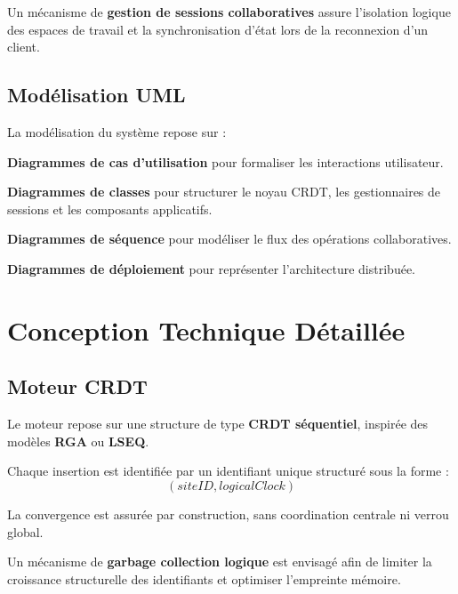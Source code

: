 \documentclass[a4paper,oneside,12pt]{book}
\begin{document}
Un mécanisme de \textbf{gestion de sessions collaboratives} assure l’isolation logique des espaces de travail et la synchronisation d’état lors de la reconnexion d’un client.

\section{\textbf{Modélisation UML}}

La modélisation du système repose sur :

\textbf{Diagrammes de cas d’utilisation} pour formaliser les interactions utilisateur.  

\textbf{Diagrammes de classes} pour structurer le noyau CRDT, les gestionnaires de sessions et les composants applicatifs.  

\textbf{Diagrammes de séquence} pour modéliser le flux des opérations collaboratives.  

\textbf{Diagrammes de déploiement} pour représenter l’architecture distribuée.

\chapter{\textbf{Conception Technique Détaillée}}

\section{\textbf{Moteur CRDT}}

Le moteur repose sur une structure de type \textbf{CRDT séquentiel}, inspirée des modèles \textbf{RGA} ou \textbf{LSEQ}.  

Chaque insertion est identifiée par un identifiant unique structuré sous la forme :  
\[
(siteID, logicalClock)
\]

La convergence est assurée par construction, sans coordination centrale ni verrou global.

Un mécanisme de \textbf{garbage collection logique} est envisagé afin de limiter la croissance structurelle des identifiants et optimiser l’empreinte mémoire.
\end{document}
